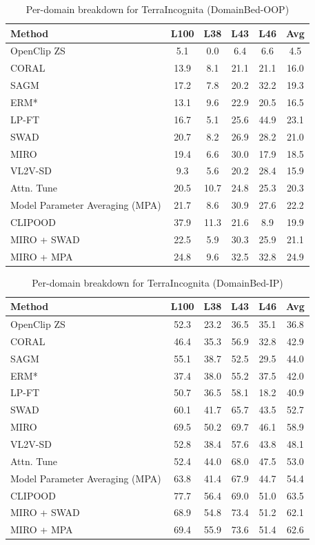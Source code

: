 \documentclass{article} %
\begin{document}
\begin{table}[t]
\small
\centering
\caption{Per-domain breakdown for TerraIncognita (DomainBed-OOP)}
\begin{tabular}{lccccc}
\toprule
\textbf{Method} & L100 & L38 & L43 & L46 & Avg \\ \midrule
OpenClip ZS & 5.1 & 0.0 &6.4 & 6.6 & 4.5\\
\midrule
CORAL & 13.9 & 8.1 & 21.1 & 21.1 & 16.0 \\ 
SAGM & 17.2 & 7.8 & 20.2 & 32.2 & 19.3 \\ 
ERM* & 13.1 & 9.6 & 22.9 & 20.5 & 16.5 \\ 
LP-FT & 16.7 & 5.1 & 25.6 & 44.9 & 23.1 \\ 
SWAD & 20.7 & 8.2 & 26.9 & 28.2 & 21.0 \\ 
MIRO & 19.4 & 6.6 & 30.0 & 17.9 & 18.5 \\ 
VL2V-SD & 9.3 & 5.6 & 20.2 & 28.4 & 15.9 \\ 
Attn. Tune & 20.5 & 10.7 & 24.8 & 25.3 & 20.3 \\ 
Model Parameter Averaging (MPA) & 21.7 & 8.6 & 30.9 & 27.6 & 22.2 \\
CLIPOOD & 37.9  & 11.3 &  21.6   & 8.9  & 19.9 \\\hline
MIRO + SWAD & 22.5 & 5.9 & 30.3 & 25.9 & 21.1 \\ 
MIRO + MPA & 24.8 & 9.6 & 32.5 & 32.8 & 24.9 \\ 
\bottomrule
\end{tabular}
\label{table:TerraIncognita OOP}
\end{table}


\begin{table}[t]
\small
\centering
\caption{Per-domain breakdown for TerraIncognita (DomainBed-IP)}
\begin{tabular}{lccccc}
\toprule
\textbf{Method} & L100 & L38 & L43 & L46 & Avg \\ \midrule
OpenClip ZS & 52.3 & 23.2 & 36.5 & 35.1 & 36.8\\
\midrule
CORAL & 46.4 & 35.3 & 56.9 & 32.8 & 42.9 \\ 
SAGM & 55.1 & 38.7 & 52.5 & 29.5 & 44.0 \\ 
ERM* & 37.4 & 38.0 & 55.2 & 37.5 & 42.0 \\ 
LP-FT & 50.7 & 36.5 & 58.1 & 18.2 & 40.9 \\ 
SWAD & 60.1 & 41.7 & 65.7 & 43.5 & 52.7 \\ 
MIRO & 69.5 & 50.2 & 69.7 & 46.1 & 58.9 \\ 
VL2V-SD & 52.8 & 38.4 & 57.6 & 43.8 & 48.1 \\
Attn. Tune & 52.4 & 44.0 & 68.0 & 47.5 & 53.0 \\ 
Model Parameter Averaging (MPA) & 63.8 & 41.4 & 67.9 & 44.7 & 54.4 \\ 
CLIPOOD & 77.7  & 56.4 & 69.0   & 51.0  & 63.5\\\hline
MIRO + SWAD & 68.9 & 54.8 & 73.4 & 51.2 & 62.1 \\ 
MIRO + MPA & 69.4 & 55.9 & 73.6 & 51.4 & 62.6 \\ 
\bottomrule
\end{tabular}
\label{table:TerraIncognita IP}
\end{table}
\end{document}
